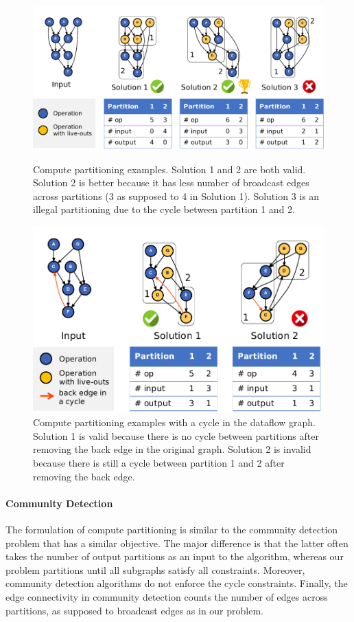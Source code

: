 \begin{figure}
  \centering
  \includegraphics[width=1\columnwidth]{figs/parteg.pdf}
  \caption[Compute partitioning]{
    Compute partitioning examples. Solution 1 and 2 are both valid. Solution 2 is
    better because it has less number of broadcast edges across partitions (3 as supposed to 4 in Solution 1). 
    Solution 3 is an illegal partitioning due to the cycle between partition 1 and 2.
  }
  \label{fig:parteg}

  \includegraphics[width=0.8\columnwidth]{figs/partcycleeg.pdf}
  \caption[Compute partitioning with cycle]{
    Compute partitioning examples with a cycle in the dataflow graph.
    Solution 1 is valid because there is no cycle between partitions after removing the back edge in the original graph.
    Solution 2 is invalid because there is still a cycle between partition 1 and 2 after removing the back edge.
  }
  \label{fig:partcycleeg}
\end{figure}

\paragraph{Community Detection}
The formulation of compute partitioning is similar to the community detection
problem\cite{community} that has a similar objective. 
The major difference is that the latter often takes the number of output partitions as an
input to the algorithm, whereas our problem partitions until all subgraphs satisfy all constraints.
Moreover, community detection algorithms do not enforce the cycle constraints. 
Finally, the edge connectivity in community detection counts the number of edges across partitions, 
as supposed to broadcast edges as in our problem.

